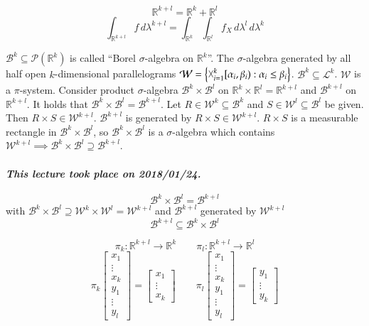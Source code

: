 \documentclass{article}
\newcommand{\set}[1]{\left\{#1\right\}}
\newcommand{\dateref}[1]{\paragraph{\textit{This lecture took place on #1.}}}
\DeclareMathOperator*{\bigtimes}{\vartimes}
\begin{document}
\[ \mathbb R^{k+l} = \mathbb R^k + \mathbb R^l \]
\[ \int_{\mathbb R^{k+l}} f \, d \lambda^{k+l} = \int_{\mathbb R^k} \int_{\mathbb R^l} f_X \, d\lambda^l \, d\lambda^k \]

$\mathcal B^k \subseteq \mathcal P(\mathbb R^k)$ is called \enquote{Borel $\sigma$-algebra on $\mathbb R^k$}.
The $\sigma$-algebra generated by all half open $k$-dimensional parallelograms $\mathcal W = \set{\bigtimes_{i=1}^k [\alpha_i, \beta_i): \alpha_i \leq \beta_i}$.
$\mathcal B^k \subseteq \mathcal L^k$. $\mathcal W$ is a $\pi$-system.
Consider product $\sigma$-algebra $\mathcal B^k \times \mathcal B^l$ on $\mathbb R^k \times \mathbb R^l = \mathbb R^{k+l}$ and $\mathcal B^{k+l}$ on $\mathbb R^{k+l}$. It holds that $\mathcal B^k \times \mathcal B^l = \mathcal B^{k+l}$. Let $R \in \mathcal W^k \subseteq \mathcal B^k$ and $S \in \mathcal W^l \subseteq \mathcal B^l$ be given. Then $R \times S \in \mathcal W^{k+l}$. $\mathcal B^{k+l}$ is generated by $R \times S \in \mathcal W^{k+l}$. $R \times S$ is a measurable rectangle in $\mathcal B^k \times \mathcal B^l$, so $\mathcal B^k \times \mathcal B^l$ is a $\sigma$-algebra which contains $\mathcal W^{k+l} \implies \mathcal B^k \times \mathcal B^l \supseteq \mathcal B^{k+l}$.
\dateref{2018/01/24}

\[ \mathcal B^k \times \mathcal B^l = \mathcal B^{k + l} \]
with $\mathcal B^k \times \mathcal B^l \supseteq \mathcal W^k \times \mathcal W^l = \mathcal W^{k + l}$ and $\mathcal B^{k + l}$ generated by $\mathcal W^{k + l}$
\[ \mathcal B^{k+l} \subseteq \mathcal B^k \times \mathcal B^l \]

\[ \pi_k: \mathbb R^{k+l} \to \mathbb R^k \qquad \pi_l: \mathbb R^{k+l} \to \mathbb R^l \]
\[
  \pi_k \begin{bmatrix} x_1 \\ \vdots \\ x_k \\ y_1 \\ \vdots \\ y_l \end{bmatrix} = \begin{bmatrix} x_1 \\ \vdots \\ x_k \end{bmatrix} \qquad
  \pi_l \begin{bmatrix} x_1 \\ \vdots \\ x_k \\ y_1 \\ \vdots \\ y_l \end{bmatrix} = \begin{bmatrix} y_1 \\ \vdots \\ y_k \end{bmatrix}
\]
\end{document}
